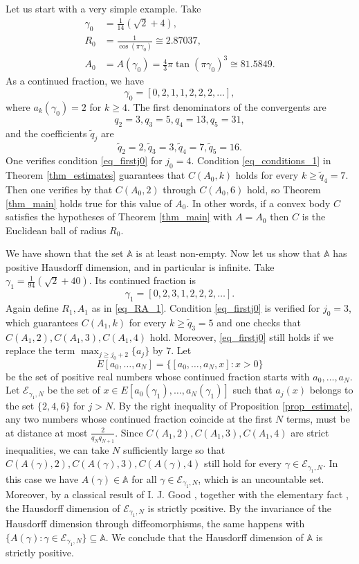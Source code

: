 \documentclass{amsart}
\begin{document}
	Let us start with a very simple example. Take
	\begin{align}
		\label{eq_RA_1}
		\gamma_0 &= \frac{1}{14} \left(\sqrt{2}+4\right) , \\
		R_0 &= \frac 1 { \cos(\pi \gamma_0) } \cong 2.87037, \\
		A_0 &= A(\gamma_0) = \frac 43 \pi \tan(\pi \gamma_0)^3 \cong 81.5849.
	\end{align}
	As a continued fraction, we have
	\[ \gamma_0 =  [0, 2, 1, 1, 2, 2, 2, \dots ], \]
	where $a_k(\gamma_0) = 2$ for $k \geq 4$.
	The first denominators of the convergents are
	\[ {q}_2=3,{q}_3=5,{q}_4=13,{q}_5=31,\]
	and the coefficients $\tilde{q}_j$ are
	\[ \tilde{q}_2=2,\tilde{q}_3=3,\tilde{q}_4=7,\tilde{q}_5=16.\]
	One verifies condition \eqref{eq_firstj0} for $j_0=4$.
	Condition \eqref{eq_conditions_1} in Theorem \ref{thm_estimates} guarantees that $C(A_0, k)$ holds for every $k \geq \tilde q_4 = 7$.
	Then one verifies by that $C(A_0,2)$ through $C(A_0,6)$ hold, so Theorem \ref{thm_main} holds true for this value of $A_0$.
	In other words, if a convex body $C$ satisfies the hypotheses of Theorem \ref{thm_main} with $A = A_0$ then $C$ is the Euclidean ball of radius $R_0$.


	We have shown that the set $\mathbb A$ is at least non-empty.
	Now let us show that $\mathbb A$ has positive Hausdorff dimension, and in particular is infinite.
	Take $\gamma_1 = \frac{1}{94} \left(\sqrt{2}+40\right)$. Its continued fraction is
	\[ \gamma_1 = [0, 2, 3, 1, 2, 2, 2, \ldots].\]
	Again define $R_1, A_1$ as in \eqref{eq_RA_1}.
	Condition \eqref{eq_firstj0} is verified for $j_0=3$, which guarantees $C(A_1, k)$ for every $k\geq \tilde q_3 = 5$ and one checks that $C(A_1,2), C(A_1, 3), C(A_1,4)$ hold.
	Moreover, \eqref{eq_firstj0} still holds if we replace the term $\max_{j \geq j_0+2}\{a_j\}$ by $7$.
	Let 
	\[E[a_0, \ldots, a_N] = \{[a_0, \ldots, a_N, x]: x>0\}\]
	be the set of positive real numbers whose continued fraction starts with $a_0, \ldots, a_N$.
	Let $\mathcal E_{\gamma_1, N}$ be the set of $x \in E[a_0(\gamma_1), \ldots, a_N(\gamma_1)]$ such that $a_j(x)$ belongs to the set $\{2,4,6\}$ for $j>N$.
	By the right inequality of Proposition \ref{prop_estimate}, any two numbers whose continued fraction coincide at the first $N$ terms, must be at distance at most $\frac 2{q_N q_{N+1}}$.
	Since $C(A_1,2), C(A_1, 3), C(A_1,4)$ are strict inequalities, we can take $N$ sufficiently large so that  $C(A(\gamma),2), C(A(\gamma), 3), C(A(\gamma),4)$ still hold for every $\gamma \in \mathcal E_{\gamma_1, N}$.
	In this case we have $A(\gamma) \in \mathbb A$ for all $\gamma \in \mathcal E_{\gamma_1, N}$, which is an uncountable set.
	Moreover, by a classical result of I. J. Good \cite[Theorem 11]{good1941fractional}, together with the elementary fact \cite[Lemma 1]{good1941fractional}, the Hausdorff dimension of $\mathcal E_{\gamma_1, N}$  is strictly positive. By the invariance of the Hausdorff dimension through diffeomorphisms, the same happens with $\{A(\gamma) : \gamma \in \mathcal E_{\gamma_1, N} \} \subseteq \mathbb A$.
	We conclude that the Hausdorff dimension of $\mathbb A$ is strictly positive.
\end{document}

